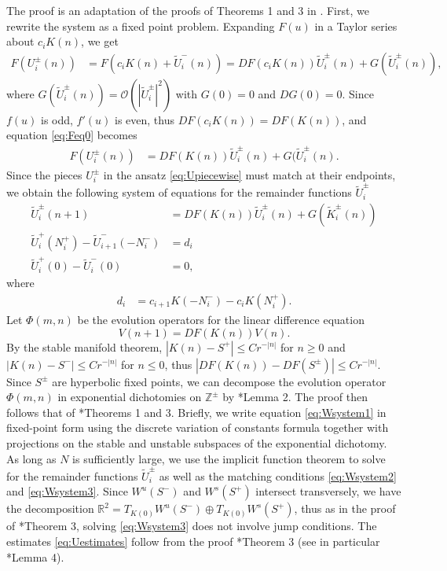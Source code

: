 \documentclass[12pt,reqno]{amsart}
\def\R{{\mathbb R}}
\def\Z{{\mathbb Z}}
\begin{document}
The proof is an adaptation of the proofs of Theorems 1 and 3 in \cite{Parker2020}. First, we rewrite the system as a fixed point problem. Expanding $F(u)$ in a Taylor series about $c_i K(n)$, we get
\begin{align}\label{eq:Feq0}
F(U_i^\pm(n)) &= F(c_i K(n) + \tilde{U}_i^-(n)) = 
D F(c_i K(n)) \tilde{U}_i^\pm(n) + G(\tilde{U}_i^\pm(n)),
\end{align}
where $G(\tilde{U}_i^\pm(n)) = \mathcal{O}(|\tilde{U}_i^\pm|^2)$ with $G(0) = 0$ and $DG(0) = 0$. Since $f(u)$ is odd, $f'(u)$ is even, thus $D F(c_i K(n)) = D F(K(n))$, and equation \cref{eq:Feq0} becomes
\begin{align}\label{eq:Feq1}
F(U_i^\pm(n)) &= 
D F(K(n)) \tilde{U}_i^\pm(n) + G(\tilde{U}_i^\pm(n).
\end{align}
Since the pieces $U_i^\pm$ in the ansatz \cref{eq:Upiecewise} must match at their endpoints, we obtain the following system of equations for the remainder functions $\tilde{U}_i^\pm$
\begin{align}
\tilde{U}_i^\pm(n+1) &= D F(K(n)) \tilde{U}_i^\pm(n) + G(\tilde{K}_i^\pm(n)) \label{eq:Wsystem1} \\
\tilde{U}_i^+(N_i^+) - \tilde{U}_{i+1}^-(-N_i^-) &= d_i \label{eq:Wsystem2} \\
\tilde{U}_i^+(0) - \tilde{U}_i^-(0) &= 0,\label{eq:Wsystem3}
\end{align}
where
\begin{align}\label{didef}
	d_i &= c_{i+1} K(-N_i^-) - c_i K(N_i^+).
\end{align}
Let $\Phi(m, n)$ be the evolution operators for the linear difference equation 
\[
V(n+1) = D F(K(n)) V(n).
\]
By the stable manifold theorem, $|K(n) - S^+| \leq C r^{-|n|}$ for $n \geq 0$ and $|K(n) - S^-| \leq C r^{-|n|}$ for $n \leq 0$, thus $| DF(K(n)) - DF(S^\pm)| \leq C r^{-|n|}$. Since $S^\pm$ are hyperbolic fixed points, we can decompose the evolution operator $\Phi(m, n)$ in exponential dichotomies on $\Z^\pm$ by \cite{Parker2020}*{Lemma 2}. The proof then follows that of \cite{Parker2020}*{Theorems 1 and 3}. Briefly, we write equation \cref{eq:Wsystem1} in fixed-point form using the discrete variation of constants formula together with projections on the stable and unstable subspaces of the exponential dichotomy. As long as $N$ is sufficiently large, we use the implicit function theorem to solve for the remainder functions $\tilde{U}_i^\pm$ as well as the matching conditions \cref{eq:Wsystem2} and \cref{eq:Wsystem3}. Since $W^u(S^-)$ and $W^s(S^+)$ intersect transversely, we have the decomposition $\R^2 = T_{K(0)}W^u(S^-)\oplus T_{K(0)}W^s(S^+)$, thus as in the proof of \cite{Parker2020}*{Theorem 3}, solving \cref{eq:Wsystem3} does not involve jump conditions. The estimates \cref{eq:Uestimates} follow from the proof \cite{Parker2020}*{Theorem 3} (see in particular \cite{Parker2020}*{Lemma 4}).
\end{document}

